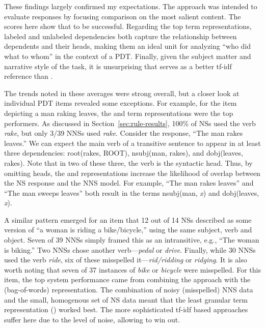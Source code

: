 These findings largely confirmed my expectations. The  approach was intended to evaluate responses by focusing comparison on the most salient content. The scores here show that to be successful. Regarding the top term representations, labeled and unlabeled dependencies both capture the relationship between dependents and their heads, making them an ideal unit for analyzing ``who did what to whom'' in the context of a PDT. Finally, given the subject matter and narrative style of the task, it is unsurprising that  serves as a better tf-idf reference than .

The trends noted in these averages were strong overall, but a closer look at individual PDT items revealed some exceptions. For example, for the item depicting a man raking leaves, the  and  term representations were the top performers. As discussed in Section~\ref{sec:rule-results}, 100\% of NSs used the verb \textit{rake}, but only 3/39 NNSs used \textit{rake}. Consider the response, ``The man rakes leaves.'' We can expect the main verb of a transitive sentence to appear in at least three dependencies: root(rakes, ROOT), nsubj(man, rakes), and dobj(leaves, rakes). Note that in two of these three, the verb is the syntactic head. Thus, by omitting heads, the  and  representations increase the likelihood of overlap between the NS response and the NNS model. For example, ``The man rakes leaves'' and ``The man sweeps leaves'' both result in the  terms nsubj(man, \textit{x}) and dobj(leaves, \textit{x}).

A similar pattern emerged for an item that 12 out of 14 NSs described as some version of ``a woman is riding a bike/bicycle,'' using the same subject, verb and object. Seven of 39 NNSs  simply framed this as an intransitive, e.g., ``The woman is biking.'' Two NNSs chose another verb---\textit{pedal} or \textit{drive}. Finally, while 30 NNSs used the verb \textit{ride}, six of these misspelled it---\textit{rid/ridding} or \textit{ridging}. It is also worth noting that seven of 37 instances of \textit{bike} or \textit{bicycle} were misspelled. For this item, the top system performance came from combining the  approach with the  (bag-of-words) representation. The combination of noisy (misspelled) NNS data and the small, homogenous set of NS data meant that the least granular term representation () worked best. The more sophisticated tf-idf based approaches suffer here due to the level of noise, allowing  to win out.

